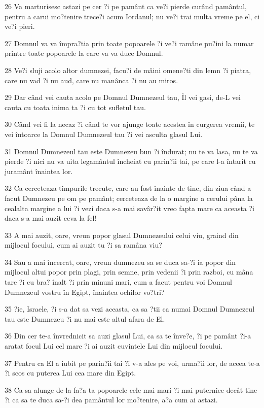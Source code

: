\par 26 Va marturisesc astazi pe cer ?i pe pamânt ca ve?i pierde curând pamântul, pentru a carui mo?tenire trece?i acum Iordanul; nu ve?i trai multa vreme pe el, ci ve?i pieri.
\par 27 Domnul va va împra?tia prin toate popoarele ?i ve?i ramâne pu?ini la numar printre toate popoarele la care va va duce Domnul.
\par 28 Ve?i sluji acolo altor dumnezei, facu?i de mâini omene?ti din lemn ?i piatra, care nu vad ?i nu aud, care nu manânca ?i nu au miros.
\par 29 Dar când vei cauta acolo pe Domnul Dumnezeul tau, Îl vei gasi, de-L vei cauta cu toata inima ta ?i cu tot sufletul tau.
\par 30 Când vei fi la necaz ?i când te vor ajunge toate acestea în curgerea vremii, te vei întoarce la Domnul Dumnezeul tau ?i vei asculta glasul Lui.
\par 31 Domnul Dumnezeul tau este Dumnezeu bun ?i îndurat; nu te va lasa, nu te va pierde ?i nici nu va uita legamântul încheiat cu parin?ii tai, pe care l-a întarit cu juramânt înaintea lor.
\par 32 Ca cerceteaza timpurile trecute, care au fost înainte de tine, din ziua când a facut Dumnezeu pe om pe pamânt; cerceteaza de la o margine a cerului pâna la cealalta margine a lui ?i vezi daca s-a mai savâr?it vreo fapta mare ca aceasta ?i daca s-a mai auzit ceva la fel!
\par 33 A mai auzit, oare, vreun popor glasul Dumnezeului celui viu, graind din mijlocul focului, cum ai auzit tu ?i sa ramâna viu?
\par 34 Sau a mai încercat, oare, vreun dumnezeu sa se duca sa-?i ia popor din mijlocul altui popor prin plagi, prin semne, prin vedenii ?i prin razboi, cu mâna tare ?i cu bra? înalt ?i prin minuni mari, cum a facut pentru voi Domnul Dumnezeul vostru în Egipt, înaintea ochilor vo?tri?
\par 35 ?ie, Israele, ?i s-a dat sa vezi aceasta, ca sa ?tii ca numai Domnul Dumnezeul tau este Dumnezeu ?i nu mai este altul afara de El.
\par 36 Din cer te-a învrednicit sa auzi glasul Lui, ca sa te înve?e, ?i pe pamânt ?i-a aratat focul Lui cel mare ?i ai auzit cuvintele Lui din mijlocul focului.
\par 37 Pentru ca El a iubit pe parin?ii tai ?i v-a ales pe voi, urma?ii lor, de aceea te-a ?i scos cu puterea Lui cea mare din Egipt.
\par 38 Ca sa alunge de la fa?a ta popoarele cele mai mari ?i mai puternice decât tine ?i ca sa te duca sa-?i dea pamântul lor mo?tenire, a?a cum ai astazi.
